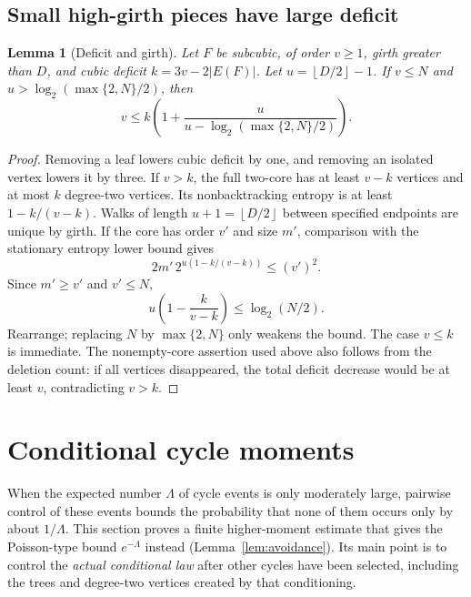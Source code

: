 \documentclass[11pt,a4paper]{article}
\numberwithin{equation}{section}
\newtheorem{lemma}[theorem]{Lemma}
\theoremstyle{definition}
\theoremstyle{remark}
\newcommand{\floor}[1]{\left\lfloor#1\right\rfloor}
\begin{document}
\subsection{Small high-girth pieces have large deficit}
\begin{lemma}[Deficit and girth]\label{lem:deficit-girth}
Let $F$ be subcubic, of order $v\ge1$, girth greater than $D$, and cubic deficit $k=3v-2|E(F)|$. Let $u=\floor{D/2}-1$. If $v\le N$ and $u>\log_2(\max\{2,N\}/2)$, then
\begin{equation}\label{eq:deficit-girth}
 v\le k\left(1+\frac{u}{u-\log_2(\max\{2,N\}/2)}\right).
\end{equation}
\end{lemma}
\begin{proof}
Removing a leaf lowers cubic deficit by one, and removing an isolated vertex lowers it by three. If $v>k$, the full two-core has at least $v-k$ vertices and at most $k$ degree-two vertices. Its nonbacktracking entropy is at least $1-k/(v-k)$. Walks of length $u+1=\floor{D/2}$ between specified endpoints are unique by girth. If the core has order $v'$ and size $m'$, comparison with the stationary entropy lower bound gives
\[
 2m'\,2^{u(1-k/(v-k))}\le(v')^2.
\]
Since $m'\ge v'$ and $v'\le N$,
\[
 u\left(1-\frac{k}{v-k}\right)\le\log_2(N/2).
\]
Rearrange; replacing $N$ by $\max\{2,N\}$ only weakens the bound. The case $v\le k$ is immediate. The nonempty-core assertion used above also follows from the deletion count: if all vertices disappeared, the total deficit decrease would be at least $v$, contradicting $v>k$.
\end{proof}

\section{Conditional cycle moments}\label{sec:conditional}
When the expected number $\Lambda$ of cycle events is only moderately large, pairwise control of these events bounds the probability that none of them occurs only by about $1/\Lambda$. This section proves a finite higher-moment estimate that gives the Poisson-type bound $e^{-\Lambda}$ instead (Lemma~\ref{lem:avoidance}). Its main point is to control the \emph{actual conditional law} after other cycles have been selected, including the trees and degree-two vertices created by that conditioning.
\end{document}
